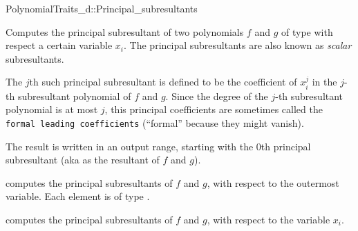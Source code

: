 \begin{ccRefConcept}{PolynomialTraits_d::Principal_subresultants}
\ccDefinition

Computes the principal subresultant of two polynomials $f$ and $g$ of 
type  
with respect a certain variable $x_i$.
The principal subresultants are also known as {\it scalar} subresultants.

The $j$th such principal subresultant is defined to be the coefficient 
of $x_i^j$ in the $j$-th subresultant polynomial of $f$ and $g$.
Since the degree of the $j$-th subresultant polynomial is at most $j$,
this principal coefficients are sometimes called the 
{\tt formal leading coefficients} (``formal'' because they might vanish).

The result is written in an output range, 
starting with the $0$th principal subresultant
(aka as the resultant of $f$ and $g$).

\ccOperations
{}
         { computes the principal subresultants of $f$ and $g$, 
           with respect to the outermost variable. Each element is of type
           .}

         { computes the principal subresultants of $f$ and $g$, 
           with respect to the variable $x_i$.}


\ccSeeAlso

\\
\\

\end{ccRefConcept}
